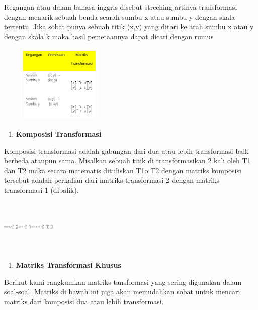 \documentclass[11pt,fleqn]{book} %
\begin{document}
\noindent
Regangan atau dalam bahasa inggris disebut streching  artinya transformasi dengan menarik sebuah benda searah sumbu x atau sumbu y dengan skala tertentu. Jika sobat punya sebuah titik (x,y) yang ditari ke arah sumbu x atau y dengan skala k maka hasil pemetaannya dapat dicari dengan rumus
\noindent
\begin{center}
	\noindent \includegraphics*[width=2.32in, height=1.48in, keepaspectratio=false, trim=0.00in 0.11in 0.00in 0.00in]{Pictures/17.PNG}
\end{center}

\noindent

\begin{enumerate}
	\item  \textbf{Komposisi Transformasi}
\end{enumerate}
\noindent
Komposisi transformasi adalah gabungan dari dua atau lebih transformasi baik berbeda ataupun sama.  Misalkan sebuah titik di transformasikan 2 kali oleh T1 dan T2 maka secara matematis dituliskan T1o T2 dengan matriks komposisi tersebut adalah perkalian dari matriks transformasi 2 dengan matriks transformasi 1 (dibalik).

\noindent
\begin{center}
	\noindent \includegraphics*[width=1.01in, height=1.01in, keepaspectratio=false, trim=0.00in 0.11in 0.00in 0.00in]{Pictures/18.PNG}
\end{center}

\noindent
\begin{enumerate}
	\item  \textbf{Matriks Transformasi Khusus}
\end{enumerate}
\noindent
Berikut kami rangkumkan matriks tansformasi yang sering digunakan dalam soal-soal. Matriks di bawah ini juga akan memudahkan sobat untuk mencari matriks dari komposisi dua atau lebih transformasi.
\end{document}
